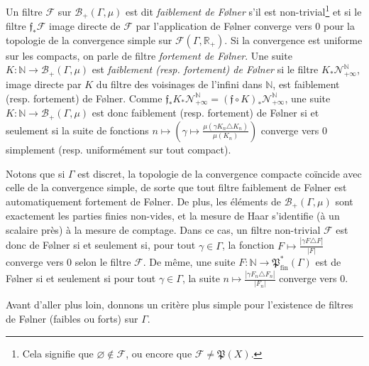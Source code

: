 \documentclass[a4paper,12pt]{article}
\newcommand{\R}{\mathbb{R}}
\newcommand{\N}{\mathbb{N}}
\newcommand{\Bor}{\mathcal{B}}
\newcommand{\abs}[1]{\left\vert#1\right\vert}
\newcommand{\card}[1]{\abs{#1}}
\newcommand{\ssi}{si et seulement si }
\newcommand{\comp}{\circ}
\newcommand{\nhds}{\mathcal{N}}
\newcommand{\parts}{\mathfrak{P}}
\newcommand{\finparts}{\mathfrak{P}_{\mathrm{fin}}}
\begin{document}
Un filtre $\mathscr{F}$ sur $\Bor_+(\Gamma, \mu)$ est dit \emph{faiblement de F\o{}lner} s'il est non-trivial\footnote{Cela signifie que $\varnothing\notin\mathscr{F}$,
ou encore que $\mathscr{F}\ne\parts(X)$.} et si le filtre $\mathfrak{f}_*\mathscr{F}$ image directe 
de $\mathscr{F}$ par l'application de F\o{}lner converge vers $0$ pour la topologie de la convergence simple sur $\mathcal{F}(\Gamma, \R_+)$. 
Si la convergence est uniforme sur les compacts, on parle de filtre \emph{fortement de F\o{}lner}.
Une suite $K:\N\to\Bor_+(\Gamma, \mu)$ est \emph{faiblement (resp. fortement) de F\o{}lner} si le filtre $K_*\nhds_{+\infty}^\N$, image directe par $K$ du filtre des
voisinages de l'infini dans $\N$, est faiblement (resp. fortement) de F\o{}lner. Comme $\mathfrak{f}_*K_*\nhds_{+\infty}^\N = (\mathfrak{f}\comp K)_*\nhds_{+\infty}^\N$,
une suite $K:\N\to\Bor_+(\Gamma, \mu)$ est donc faiblement (resp. fortement) de F\o{}lner \ssi la suite de fonctions
$n\mapsto\left(\gamma\mapsto\frac{\mu(\gamma K_n\triangle K_n)}{\mu(K_n)}\right)$ converge vers $0$ simplement 
(resp. uniformément sur tout compact).

Notons que si $\Gamma$ est discret, 
la topologie de la convergence compacte coïncide avec celle de la convergence simple, de sorte que tout filtre 
faiblement de F\o{}lner est automatiquement fortement de F\o{}lner.
De plus, les éléments de $\Bor_+(\Gamma, \mu)$ sont exactement les parties finies non-vides,
et la mesure de Haar s'identifie (à un scalaire près) à la mesure de comptage. Dans ce cas, un filtre non-trivial $\mathscr{F}$
est donc de F\o{}lner si et seulement si, pour tout $\gamma\in\Gamma$, la fonction $F\mapsto \frac{\card{\gamma F\triangle F}}{\card{F}}$ 
converge vers $0$ selon le filtre $\mathscr{F}$. De même, une suite $F:\N\to\finparts^*(\Gamma)$
est de F\o{}lner \ssi pour tout $\gamma\in\Gamma$, la suite $n\mapsto\frac{\card{\gamma F_n\triangle F_n}}{\card{F_n}}$ converge 
vers $0$.

Avant d'aller plus loin, donnons un critère plus simple pour l'existence de filtres de F\o{}lner (faibles ou forts) sur $\Gamma$.
\end{document}
